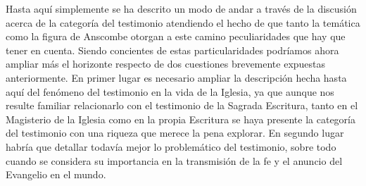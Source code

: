 Hasta aquí simplemente se ha descrito un modo de andar a través de la discusión
acerca de la categoría del testimonio atendiendo el hecho de que tanto la
temática como la figura de Anscombe otorgan a este camino peculiaridades que hay
que tener en cuenta. Siendo concientes de estas particularidades podríamos ahora
ampliar más el horizonte respecto de dos cuestiones brevemente expuestas
anteriormente. En primer lugar es necesario ampliar la descripción hecha hasta
aquí del fenómeno del testimonio en la vida de la Iglesia, ya que aunque nos
resulte familiar relacionarlo con el testimonio de la Sagrada Escritura, tanto
en el Magisterio de la Iglesia como en la propia Escritura se haya presente la
categoría del testimonio con una riqueza que merece la pena explorar. En segundo
lugar habría que detallar todavía mejor lo problemático del testimonio, sobre
todo cuando se considera su importancia en la transmisión de la fe y el anuncio
del Evangelio en el mundo.
